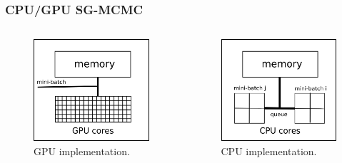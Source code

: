\documentclass[10pt,a4paper]{beamer}
\begin{document}
\begin{frame}\frametitle{CPU/GPU SG-MCMC}
	\begin{columns}[T]
	\begin{figure}
			\includegraphics[width=\textwidth]{figures/gpu_architechture}
			\caption{GPU implementation.}
			\label{fig:gpuarchitechture}
			
		\end{figure}
	\begin{figure}
			\includegraphics[width=\textwidth]{figures/cpu_architechture}
			\caption{CPU implementation.}
			\label{fig:cpuarchitechture}
		\end{figure}
	\end{columns}
\end{frame}
\end{document}

